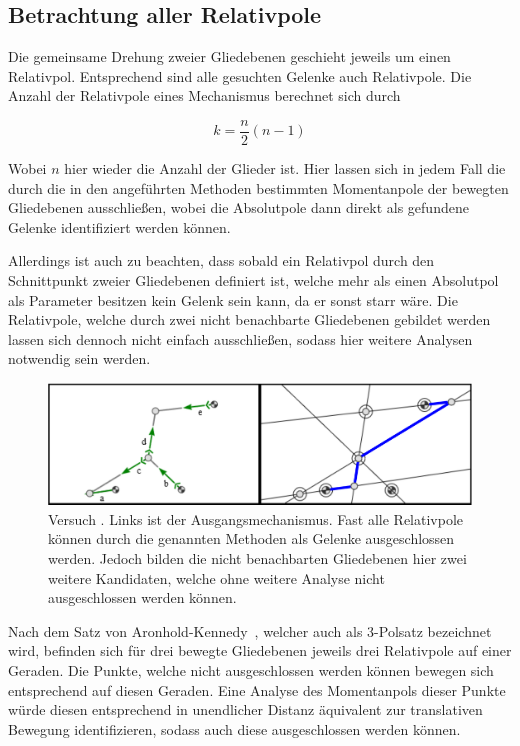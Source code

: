 \subsection{Betrachtung aller Relativpole}

Die gemeinsame Drehung zweier Gliedebenen geschieht jeweils um einen Relativpol.
Entsprechend sind alle gesuchten Gelenke auch Relativpole.
Die Anzahl der Relativpole eines Mechanismus berechnet sich durch~\cite{Goessner2016}

\begin{equation}
    k = \frac{n}{2}(n-1)
    \label{eq:anzahl_pole}
\end{equation}

Wobei $n$ hier wieder die Anzahl der Glieder ist.
Hier lassen sich in jedem Fall die durch die in den angeführten Methoden bestimmten Momentanpole der bewegten Gliedebenen ausschlie{\ss}en, wobei die Absolutpole dann direkt als gefundene Gelenke identifiziert werden können.

Allerdings ist auch zu beachten, dass sobald ein Relativpol durch den Schnittpunkt zweier Gliedebenen definiert ist, welche mehr als einen Absolutpol als Parameter besitzen kein Gelenk sein kann, da er sonst starr wäre.
Die Relativpole, welche durch zwei nicht benachbarte Gliedebenen gebildet werden lassen sich dennoch nicht einfach ausschlie{\ss}en, sodass hier weitere Analysen notwendig sein werden.

\begin{figure}
    \includegraphics[width=\textwidth]{gfx/gruppe4_3_edit.png}
    \caption[Versuch ]{Versuch . Links ist der Ausgangsmechanismus. Fast alle Relativpole können durch die genannten Methoden als Gelenke ausgeschlossen werden. Jedoch bilden die nicht benachbarten Gliedebenen hier zwei weitere Kandidaten, welche ohne weitere Analyse nicht ausgeschlossen werden können.}
    \label{fig:gruppe4_3}
\end{figure}

Nach dem Satz von Aronhold-Kennedy~\cite{Goessner2016, Kerle2016}, welcher auch als 3-Polsatz bezeichnet wird, befinden sich für drei bewegte Gliedebenen jeweils drei Relativpole auf einer Geraden.
Die Punkte, welche nicht ausgeschlossen werden können bewegen sich entsprechend auf diesen Geraden.
Eine Analyse des Momentanpols dieser Punkte würde diesen entsprechend in unendlicher Distanz äquivalent zur translativen Bewegung identifizieren, sodass auch diese ausgeschlossen werden können.

